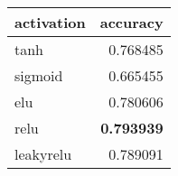\begin{tabular}{lr}
\toprule
activation &  accuracy \\
\midrule
tanh      &  0.768485 \\
sigmoid   &  0.665455 \\
elu       &  0.780606 \\
relu      &  \textbf{0.793939} \\
leakyrelu &  0.789091 \\
\bottomrule
\end{tabular}
